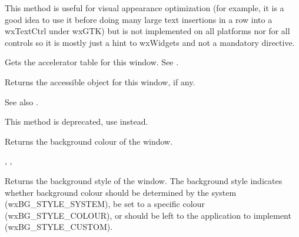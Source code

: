 This method is useful for visual appearance optimization (for example, it
is a good idea to use it before doing many large text insertions in a row into
a wxTextCtrl under wxGTK) but is not implemented on all platforms nor for all
controls so it is mostly just a hint to wxWidgets and not a mandatory
directive.




\label{wxwindowgetacceleratortable}


Gets the accelerator table for this window. See .


\label{wxwindowgetaccessible}


Returns the accessible object for this window, if any.

See also .


\label{wxwindowgetadjustedbestsize}


This method is deprecated, use 
instead.


\label{wxwindowgetbackgroundcolour}


Returns the background colour of the window.


,\rtfsp
{},\rtfsp
{}

\label{wxwindowgetbackgroundstyle}


Returns the background style of the window. The background style indicates
whether background colour should be determined by the system (wxBG\_STYLE\_SYSTEM),
be set to a specific colour (wxBG\_STYLE\_COLOUR), or should be left to the
application to implement (wxBG\_STYLE\_CUSTOM).

